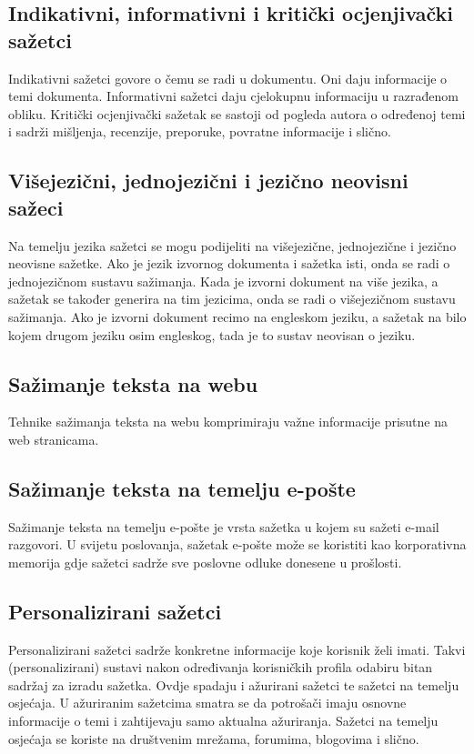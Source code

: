 \documentclass[times, utf8, zavrsni, numeric]{fer}
\begin{document}
\subsection{Indikativni, informativni i kritički ocjenjivački sažetci}
Indikativni sažetci govore o čemu se radi u dokumentu. Oni daju informacije o temi dokumenta.
Informativni sažetci daju cjelokupnu informaciju u razrađenom obliku.
Kritički ocjenjivački sažetak se sastoji od pogleda autora o određenoj temi i sadrži mišljenja, recenzije, preporuke, povratne informacije i slično.
\subsection{Višejezični, jednojezični i jezično neovisni sažeci}
Na temelju jezika sažetci se mogu podijeliti na višejezične, jednojezične i jezično neovisne sažetke.
Ako je jezik izvornog dokumenta i sažetka isti, onda se radi o jednojezičnom sustavu sažimanja.
Kada je izvorni dokument na više jezika, a sažetak se također generira na tim jezicima, onda se radi o višejezičnom sustavu sažimanja.
Ako je izvorni dokument recimo na engleskom jeziku, a sažetak na bilo kojem drugom jeziku osim engleskog, tada je to sustav neovisan o jeziku.
\subsection{Sažimanje teksta na webu}
Tehnike sažimanja teksta na webu komprimiraju važne informacije prisutne na web stranicama.
\subsection{Sažimanje teksta na temelju e-pošte}
Sažimanje teksta na temelju e-pošte je vrsta sažetka u kojem su sažeti e-mail razgovori.
U svijetu poslovanja, sažetak e-pošte može se koristiti kao korporativna memorija gdje sažetci sadrže sve poslovne odluke donesene u prošlosti.
\subsection{Personalizirani sažetci}
Personalizirani sažetci sadrže konkretne informacije koje korisnik želi imati.
Takvi (personalizirani) sustavi nakon određivanja korisničkih profila odabiru bitan sadržaj za izradu sažetka.
Ovdje spadaju i ažurirani sažetci te sažetci na temelju osjećaja.
U ažuriranim sažetcima smatra se da potrošači imaju osnovne informacije o temi i zahtijevaju samo aktualna ažuriranja.
Sažetci na temelju osjećaja se koriste na društvenim mrežama, forumima, blogovima i slično.
\end{document}
